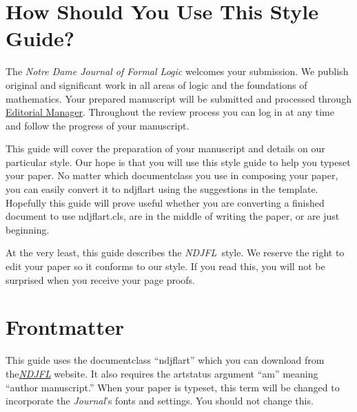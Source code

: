 \documentclass{ndjflart}
\theoremstyle{definition}
\theoremstyle{remark}
\newcommand{\NDJFL}{\emph{NDJFL}}
\newcommand{\Jo}{\emph{Journal}}
\begin{document}
\begin{frontmatter}
\begin{keyword}[class=AMS]
    
\end{keyword}

\begin{keyword}
   
\end{keyword}

\end{frontmatter}


\section{How Should You Use This Style Guide?}\label{intro}
The \emph{Notre Dame Journal of Formal Logic} welcomes your
submission.  We publish original and significant work in all areas of
logic and the foundations of mathematics.  Your prepared manuscript
will be submitted and processed through
\href{http://www.editorialmanager.com/ndjfl}{Editorial Manager}.
Throughout the review process you can log in at any time and follow
the progress of your manuscript.

This guide will cover the preparation of your manuscript and details
on our particular style.  Our hope is that you will use this style
guide to help you typeset your paper.  No matter which documentclass
you use in composing your paper, you can easily convert it to ndjflart
using the suggestions in the template.  Hopefully this guide will
prove useful whether you are converting a finished document to use
ndjflart.cls, are in the middle of writing the paper, or are just
beginning.

At the very least, this guide describes the \NDJFL\ style. We reserve
the right to edit your paper so it conforms to our style. If you read
this, you will not be surprised when you receive your page proofs.


\section{Frontmatter}\label{front}
This guide uses the documentclass ``ndjflart'' which you can download
from the\linebreak \href{http://ndjfl.nd.edu}{\NDJFL} website.  It
also requires the artstatus argument ``am'' meaning ``author
manuscript.''  When your paper is typeset, this term will be changed
to incorporate the \Jo's fonts and settings.  You should not change
this.
\end{document}
